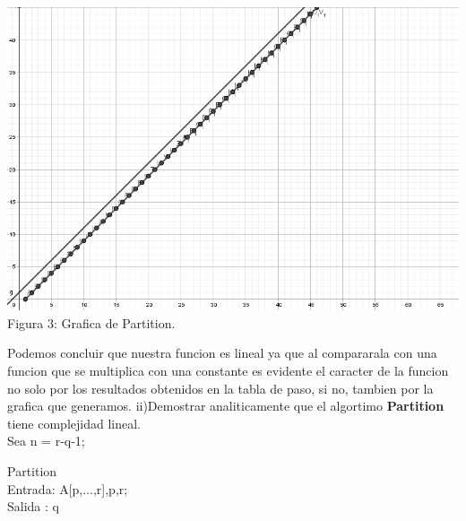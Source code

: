 \documentclass[spanish]{article}
\begin{document}
	\begin{center}
		\includegraphics[scale=.5]{./imagenes/partition.png}\\
		Figura 3: Grafica de Partition.
	\end{center}
	Podemos concluir que nuestra funcion es lineal ya que al compararala con una funcion que se multiplica con una constante es evidente el caracter de la funcion no solo por los resultados obtenidos en la tabla de paso, si no, tambien por la grafica que generamos.
	\bigskip
\newpage
	{\large ii)Demostrar analiticamente que el algortimo {\bf Partition} tiene complejidad lineal.}\\
	
	\bigskip
		Sea n = r-q-1;
	\bigskip
	
	Partition \\
	Entrada: A[p,...,r],p,r;\\
	Salida : q
	\bigskip
	
\end{document}
